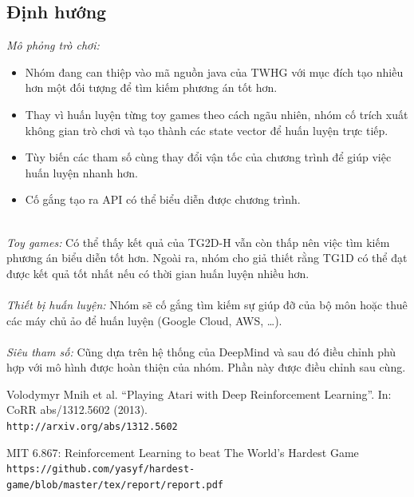 \documentclass[12pt,a4paper]{article}
\begin{document}
\subsection{Định hướng}
\textit{Mô phỏng trò chơi:} 
\begin{itemize}
    \item Nhóm đang can thiệp vào mã nguồn java của TWHG với mục đích tạo nhiều hơn một đối tượng để tìm kiếm phương án tốt hơn.
    \item Thay vì huấn luyện từng toy games theo cách ngãu nhiên, nhóm cố trích xuất không gian trò chơi và tạo thành các state vector để huấn luyện trực tiếp.
    \item Tùy biến các tham số cùng thay đổi vận tốc của chương trình để giúp việc huấn luyện nhanh hơn.
    \item Cố gắng tạo ra API có thể biểu diễn được chương trình.
\end{itemize} \\
\textit{Toy games:} Có thể thấy kết quả của TG2D-H vẫn còn thấp nên việc tìm kiếm phương án biểu diễn tốt hơn. Ngoài ra, nhóm cho giả thiết rằng TG1D có thể đạt được kết quả tốt nhất nếu có thời gian huấn luyện nhiều hơn.\\
\\
\textit{Thiết bị huấn luyện:} Nhóm sẽ cố gắng tìm kiếm sự giúp đỡ của bộ môn hoặc thuê các máy chủ ảo để huấn luyện (Google Cloud, AWS, \dots).\\
\\
\textit{Siêu tham số:} Cũng dựa trên hệ thống của DeepMind và sau đó điều chỉnh phù hợp với mô hình được hoàn thiện của nhóm. Phần này được điều chỉnh sau cùng.\\
\clearpage
{}
\begin{thebibliography}{9}
Volodymyr Mnih et al. “Playing Atari with Deep Reinforcement Learning”. In: CoRR abs/1312.5602 (2013).
\\\texttt{http://arxiv.org/abs/1312.5602}

MIT 6.867: Reinforcement Learning to beat The World's Hardest Game 
\\\texttt{https://github.com/yasyf/hardest-game/blob/master/tex/report/report.pdf}
\end{thebibliography}
\end{document}
